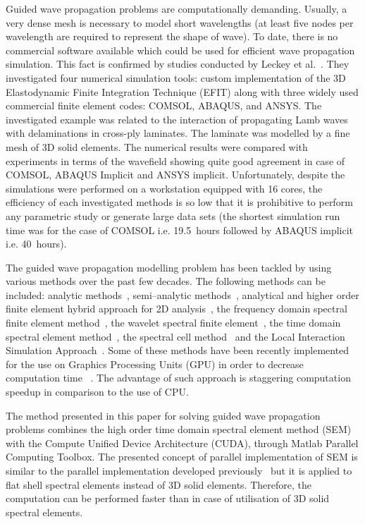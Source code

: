 \documentclass[runningheads]{llncs}
\newcommand{\etal}{et al.}
\begin{document}
Guided wave propagation problems are computationally demanding.
Usually, a very dense mesh is necessary to model short wavelengths (at least five nodes per wavelength are required to represent the shape of wave).
To date, there is no commercial software available which could be used for efficient wave propagation simulation. 
This fact is confirmed by studies conducted by Leckey \etal~\cite{Leckey2018}. 
They investigated four numerical simulation tools: custom implementation of the 3D Elastodynamic Finite Integration Technique (EFIT) \cite{Schubert1998} along with three widely used commercial finite element codes: COMSOL, ABAQUS, and ANSYS. 
The investigated example was related to the interaction of propagating Lamb waves with delaminations in cross-ply laminates. 
The laminate was modelled by a fine mesh of 3D solid elements. 
The numerical results were compared with experiments in terms of the wavefield showing quite good agreement in case of COMSOL, ABAQUS Implicit and ANSYS implicit. 
Unfortunately, despite the simulations were performed on a workstation equipped with 16 cores, the efficiency of each investigated methods is so low that it is prohibitive to perform any parametric study or generate large data sets (the shortest simulation run time was for the case of COMSOL i.e. 19.5~hours followed by ABAQUS implicit i.e. 40~hours).

The guided wave propagation modelling problem has been tackled by using various methods over the past few decades. 
The following methods can be included: analytic methods~\cite{Giurgiutiu2014}, semi--analytic methods~\cite{Bartoli2006,Gravenkamp2014},  analytical and higher order finite element hybrid approach for 2D analysis~\cite{Vivar-Perez2014}, the frequency domain spectral finite element method~\cite{Doyle1989,RoyMahapatra2003},  the wavelet spectral finite element~\cite{Mitra2008,Yang2016}, the time domain spectral element method~\cite{Schulte2010,Ostachowicz2012,Lonkar2013}, the spectral cell method~\cite{Duczek2014} and  the Local Interaction Simulation Approach~\cite{Kijanka2013}.
Some of these methods have been recently implemented for the use on Graphics Processing Units (GPU) in order to decrease computation time ~\cite{Kijanka2013,Kudela2016,Shen2017,Mossaiby2019}.
The advantage of such approach is staggering computation speedup in comparison to the use of CPU.

The method presented in this paper for solving guided wave propagation problems combines the high order time domain spectral element method (SEM) with the Compute Unified Device Architecture (CUDA),  through Matlab Parallel Computing Toolbox. 
The presented concept of parallel implementation of SEM is similar to the parallel implementation developed previously~\cite{Kudela2016} but it is applied to flat shell spectral elements instead of 3D solid elements. 
Therefore, the computation can be performed faster than in case of utilisation of 3D solid spectral elements. 
\end{document}
